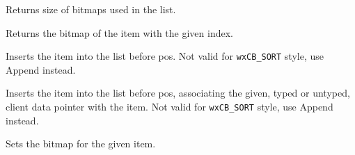 \label{wxbitmapcomboboxgetbitmapsize}


Returns size of bitmaps used in the list.


\label{wxbitmapcomboboxgetitembitmap}


Returns the bitmap of the item with the given index.


\label{wxbitmapcomboboxinsert}


Inserts the item into the list before pos.
Not valid for {\tt wxCB\_SORT} style, use Append instead.



Inserts the item into the list before pos, associating the given, typed or
untyped, client data pointer with the item.
Not valid for {\tt wxCB\_SORT} style, use Append instead.


\label{wxbitmapcomboboxsetitembitmap}


Sets the bitmap for the given item.
